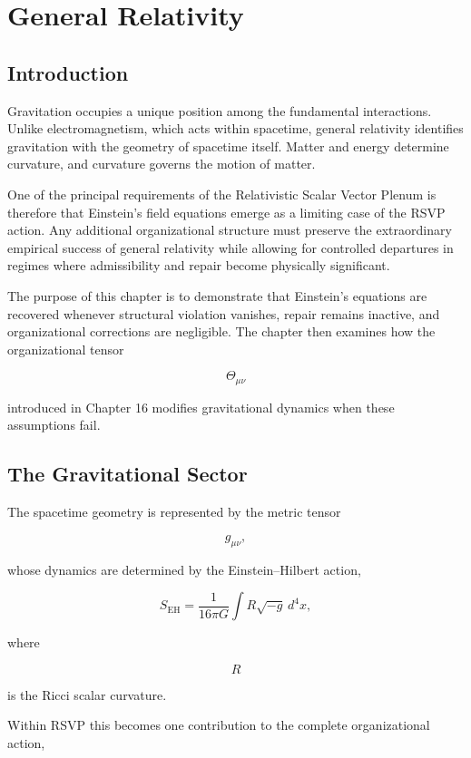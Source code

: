 \documentclass[11pt,oneside]{book}
\numberwithin{equation}{chapter}
\theoremstyle{definition}
\theoremstyle{plain}
\begin{document}
\chapter{General Relativity}

\section{Introduction}

Gravitation occupies a unique position among the fundamental interactions.
Unlike electromagnetism, which acts within spacetime, general relativity
identifies gravitation with the geometry of spacetime itself. Matter and
energy determine curvature, and curvature governs the motion of matter.

One of the principal requirements of the Relativistic Scalar Vector Plenum
is therefore that Einstein's field equations emerge as a limiting case of
the RSVP action. Any additional organizational structure must preserve the
extraordinary empirical success of general relativity while allowing for
controlled departures in regimes where admissibility and repair become
physically significant.

The purpose of this chapter is to demonstrate that Einstein's equations are
recovered whenever structural violation vanishes, repair remains inactive,
and organizational corrections are negligible. The chapter then examines how
the organizational tensor

\[
\Theta_{\mu\nu}
\]

introduced in Chapter 16 modifies gravitational dynamics when these
assumptions fail.

\section{The Gravitational Sector}

The spacetime geometry is represented by the metric tensor

\[
g_{\mu\nu},
\]

whose dynamics are determined by the Einstein--Hilbert action,

\[
S_{\mathrm{EH}}
=
\frac{1}{16\pi G}
\int
R
\sqrt{-g}\,
d^4x,
\]

where

\[
R
\]

is the Ricci scalar curvature.

Within RSVP this becomes one contribution to the complete organizational
action,
\end{document}
